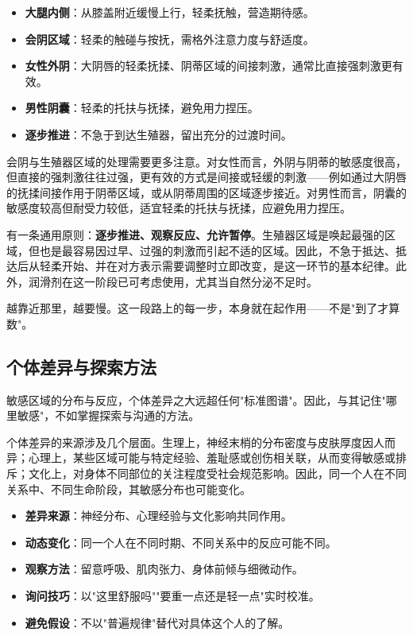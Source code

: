 \documentclass[12pt,UTF8]{ctexbook}
\newcommand{\keyword}[1]{\textbf{#1}}
\begin{document}
\begin{itemize}
  \item \keyword{大腿内侧}：从膝盖附近缓慢上行，轻柔抚触，营造期待感。
  \item \keyword{会阴区域}：轻柔的触碰与按抚，需格外注意力度与舒适度。
  \item \keyword{女性外阴}：大阴唇的轻柔抚揉、阴蒂区域的间接刺激，通常比直接强刺激更有效。
  \item \keyword{男性阴囊}：轻柔的托扶与抚揉，避免用力捏压。
  \item \keyword{逐步推进}：不急于到达生殖器，留出充分的过渡时间。
\end{itemize}

会阴与生殖器区域的处理需要更多注意。对女性而言，外阴与阴蒂的敏感度很高，但直接的强刺激往往过强，更有效的方式是间接或轻缓的刺激——例如通过大阴唇的抚揉间接作用于阴蒂区域，或从阴蒂周围的区域逐步接近。对男性而言，阴囊的敏感度较高但耐受力较低，适宜轻柔的托扶与抚揉，应避免用力捏压。

有一条通用原则：\keyword{逐步推进、观察反应、允许暂停}。生殖器区域是唤起最强的区域，但也是最容易因过早、过强的刺激而引起不适的区域。因此，不急于抵达、抵达后从轻柔开始、并在对方表示需要调整时立即改变，是这一环节的基本纪律。此外，润滑剂在这一阶段已可考虑使用，尤其当自然分泌不足时。

\begin{tcolorbox}[colback=pink!5!white,colframe=red!50!black,title=贴心小叮咛]
越靠近那里，越要慢。这一段路上的每一步，本身就在起作用——不是"到了才算数"。
\end{tcolorbox}
\subsection{个体差异与探索方法}

敏感区域的分布与反应，个体差异之大远超任何"标准图谱"。因此，与其记住"哪里敏感"，不如掌握探索与沟通的方法。

个体差异的来源涉及几个层面。生理上，神经末梢的分布密度与皮肤厚度因人而异；心理上，某些区域可能与特定经验、羞耻感或创伤相关联，从而变得敏感或排斥；文化上，对身体不同部位的关注程度受社会规范影响。因此，同一个人在不同关系中、不同生命阶段，其敏感分布也可能变化。

\begin{itemize}
  \item \keyword{差异来源}：神经分布、心理经验与文化影响共同作用。
  \item \keyword{动态变化}：同一个人在不同时期、不同关系中的反应可能不同。
  \item \keyword{观察方法}：留意呼吸、肌肉张力、身体前倾与细微动作。
  \item \keyword{询问技巧}：以"这里舒服吗""要重一点还是轻一点"实时校准。
  \item \keyword{避免假设}：不以"普遍规律"替代对具体这个人的了解。
\end{itemize}
\end{document}
